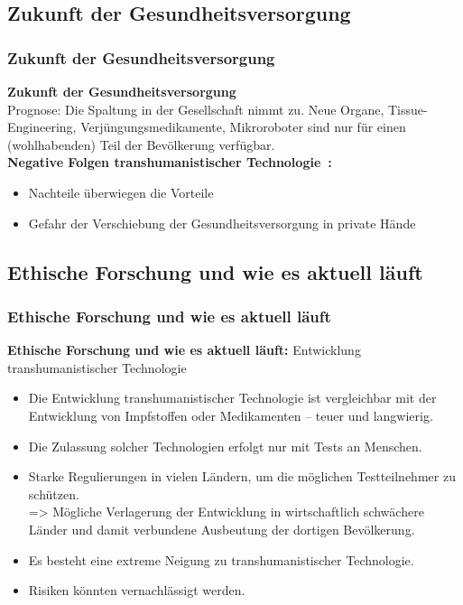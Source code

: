 \documentclass[aspectratio=169,16pt,xcolor=table]{beamer}
\begin{document}
\subsection{Zukunft der Gesundheitsversorgung}
\begin{frame}
  \frametitle{Zukunft der Gesundheitsversorgung}
  \small \textbf{Zukunft der Gesundheitsversorgung}\\
  Prognose: Die Spaltung in der Gesellschaft nimmt zu.
  Neue Organe, Tissue-Engineering, Verjüngungsmedikamente, Mikroroboter sind nur für einen (wohlhabenden) Teil der Bevölkerung verfügbar.\\
  \textbf{Negative Folgen transhumanistischer Technologie~\cite{khan_aziz_2019}:}
  \begin{itemize}
      \item Nachteile überwiegen die Vorteile
      \item Gefahr der Verschiebung der Gesundheitsversorgung in private Hände
  \end{itemize}
\end{frame}

\subsection{Ethische Forschung und wie es aktuell läuft}
\begin{frame}
  \frametitle{Ethische Forschung und wie es aktuell läuft}
  \textbf{Ethische Forschung und wie es aktuell läuft:}
  Entwicklung transhumanistischer Technologie
  \begin{itemize}
    \item Die Entwicklung transhumanistischer Technologie ist vergleichbar mit der Entwicklung von Impfstoffen oder Medikamenten – teuer und langwierig.
    \item Die Zulassung solcher Technologien erfolgt nur mit Tests an Menschen.
    \item Starke Regulierungen in vielen Ländern, um die möglichen Testteilnehmer zu schützen.\\
    => Mögliche Verlagerung der Entwicklung in wirtschaftlich schwächere Länder und damit verbundene Ausbeutung der dortigen Bevölkerung.
  \end{itemize}
\end{frame}

\begin{frame}
  \begin{itemize}
      \item Es besteht eine extreme Neigung zu transhumanistischer Technologie.
      \item Risiken könnten vernachlässigt werden.
  \end{itemize}
\end{frame}
\end{document}
